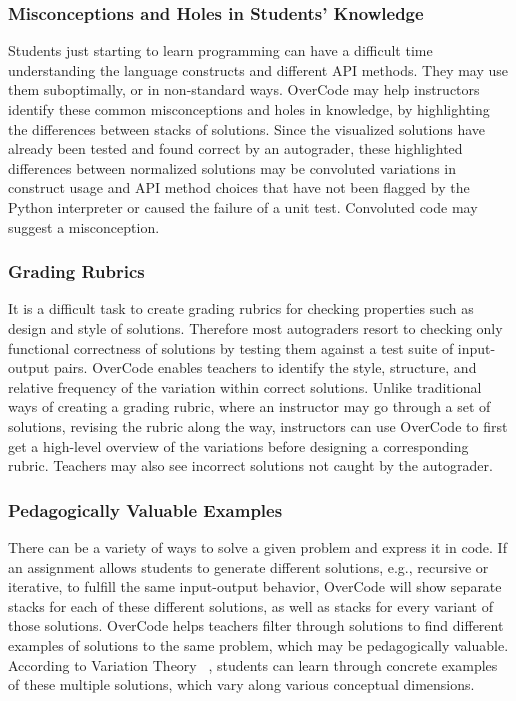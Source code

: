\subsubsection{Misconceptions and Holes in Students' Knowledge}
Students just starting to learn programming can have a difficult time understanding the language constructs and different API methods. They may use them suboptimally, or in non-standard ways. OverCode may help instructors identify these common misconceptions and holes in knowledge, by highlighting the differences between stacks of solutions. Since the visualized solutions have already been tested and found correct by an autograder, these highlighted differences between normalized solutions may be convoluted variations in construct usage and API method choices that have not been flagged by the Python interpreter or caused the failure of a unit test. Convoluted code may suggest a misconception.

\subsubsection{Grading Rubrics}
It is a difficult task to create grading rubrics for checking properties such as design and style of solutions. Therefore most autograders resort to checking only functional correctness of solutions by testing them against a test suite of input-output pairs. OverCode enables teachers to identify the style, structure, and relative frequency of the variation within correct solutions. Unlike traditional ways of creating a grading rubric, where an instructor may go through a set of solutions, revising the rubric along the way, instructors can use OverCode to first get a high-level overview of the variations before designing a corresponding rubric. Teachers may also see incorrect solutions not caught by the autograder.

\subsubsection{Pedagogically Valuable Examples} 
There can be a variety of ways to solve a given problem and express it in code. If an assignment allows students to generate different solutions, e.g., recursive or iterative, to fulfill the same input-output behavior, OverCode will show separate stacks for each of these different solutions, as well as stacks for every variant of those solutions. OverCode helps teachers filter through solutions to find different examples of solutions to the same problem, which may be pedagogically valuable. According to Variation Theory ~\cite{marton13}, students can learn through concrete examples of these multiple solutions, which vary along various conceptual dimensions.
